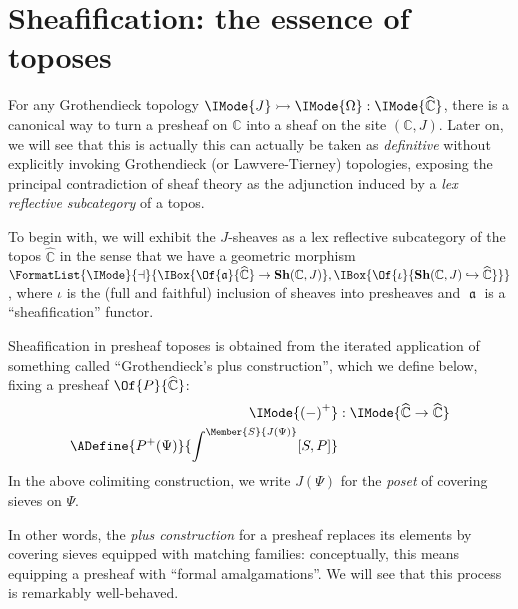 \documentclass{article}
\newcommand\Psh[1]{\widehat{#1}}
\newcommand\Sh[1]{\mathbf{Sh} (#1)}
\newcommand\IsSubobject[3]{\IMode{#1}\rightarrowtail\IMode{#2}:\IMode{#3}}
\DeclareMathOperator{\Sheafify}{\mathfrak{a}}
\newcommand\AreAdjoint[1]{\FormatList{\IMode}{\dashv}{#1}}
\newcommand\AOf[2]{\IMode{#1}&:\IMode{#2}}
\begin{document}
\section{Sheafification: the essence of toposes}

For any Grothendieck topology
$\IsSubobject{J}{\Omega}{\Psh{\mathbb{C}}}$, there is a canonical way
to turn a presheaf on $\mathbb{C}$ into a sheaf on the site
$(\mathbb{C},J)$. Later on, we will see that this is actually this can
actually be taken as \emph{definitive} without explicitly invoking
Grothendieck (or Lawvere-Tierney) topologies, exposing the principal
contradiction of sheaf theory as the adjunction induced by a \emph{lex
  reflective subcategory} of a topos.

To begin with, we will exhibit the $J$-sheaves as a lex reflective
subcategory of the topos $\Psh{\mathbb{C}}$ in the sense that we have
a geometric morphism
$\AreAdjoint{\IBox{\Of{\Sheafify}{\Psh{\mathbb{C}}}\to
    \Sh{\mathbb{C},J}},\IBox{\Of{\iota}{\Sh{\mathbb{C},J}\hookrightarrow\Psh{\mathbb{C}}}}}$,
where $\iota$ is the (full and faithful) inclusion of sheaves into
presheaves and $\Sheafify$ is a ``sheafification'' functor.

Sheafification in presheaf toposes is obtained from the iterated
application of something called ``Grothendieck's plus construction'',
which we define below, fixing a presheaf $\Of{P}{\Psh{\mathbb{C}}}$:
\begin{align*}
  \AOf{
    \Plus{(-)}
  }{
    \Psh{\mathbb{C}}\to\Psh{\mathbb{C}}
  }
  \\
  \ADefine{
    \Plus{P}(\Psi)
  }{
    \int^{\Member{S}{J(\Psi)}}
    [S,P]
  }
\end{align*}
In the above colimiting construction, we write $J(\Psi)$ for the
\emph{poset} of covering sieves on $\Psi$.

In other words, the \emph{plus construction} for a presheaf replaces
its elements by covering sieves equipped with matching families:
conceptually, this means equipping a presheaf with ``formal
amalgamations''. We will see that this process is remarkably
well-behaved.

\newcommand\IsEqOf[3]{\IMode{#1}=\IMode{#2}:\IMode{#3}}
\newcommand\Sim[2]{\IMode{#1}\sim\IMode{#2}}
\end{document}
